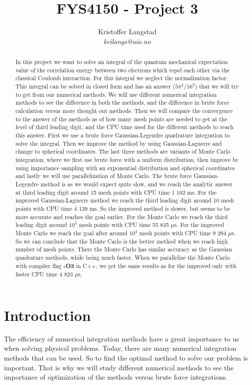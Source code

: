\documentclass[12pt,a4paper,english]{article}
\title{FYS4150 - Project 3}
\date{}
\author{ Kristoffer Langstad\\ \textit{krilangs@uio.no}}
\begin{document}
\maketitle
\begin{abstract}
In this project we want to solve an integral of the quantum mechanical expectation value of the correlation energy between two electrons which repel each other via the classical Coulomb interaction. For this integral we neglect the normalization factor. This integral can be solved in closed form and has an answer ($5\pi^2/16^2$) that we will try to get from our numerical methods. We will use different numerical integration methods to see the difference in both the methods, and the difference in brute force calculation versus more thought out methods. Then we will compare the convergence to the answer of the methods as of how many mesh points are needed to get at the level of third leading digit, and the CPU time used for the different methods to reach this answer. First we use a brute force Gaussian-Legendre quadrature integration to solve the integral. Then we improve the method by using Gaussian-Laguerre and change to spherical coordinates. The last three methods are variants of Monte Carlo integration; where we first use brute force with a uniform distribution, then improve by using importance sampling with an exponential distribution and spherical coordinates and lastly we will use parallelization of Monte Carlo. The brute force Gaussian-Legendre method is as we would expect quite slow, and we reach the analytic answer at third leading digit around 15 mesh points with CPU time 1 102 ms. For the improved Gaussian-Laguerre method we reach the third leading digit around 10 mesh points with CPU time 4 139 ms. So the improved method is slower, but seems to be more accurate and reaches the goal earlier. For the Monte Carlo we reach the third leading digit around $10^5$ mesh points with CPU time 55 835 $\mu$s. For the improved Monte Carlo we reach the goal after around $10^4$ mesh points with CPU time 9 294 $\mu$s. So we can conclude that the Monte Carlo is the better method when we reach high number of mesh points. There the Monte Carlo has similar accuracy as the Gaussian quadrature methods, while being much faster. When we parallelize the Monte Carlo with compiler flag \textbf{-O3} in C++, we get the same results as for the improved only with faster CPU time 4 823 $\mu$s.
\end{abstract}

\section{Introduction}
The efficiency of numerical integration methods have a great importance to us when solving physical problems. Today, there are many numerical integration methods that can be used. So to find the optimal method to solve our problem is important. That is why we will study different numerical methods to see the importance of optimization of the methods versus brute force integrations.
\end{document}
